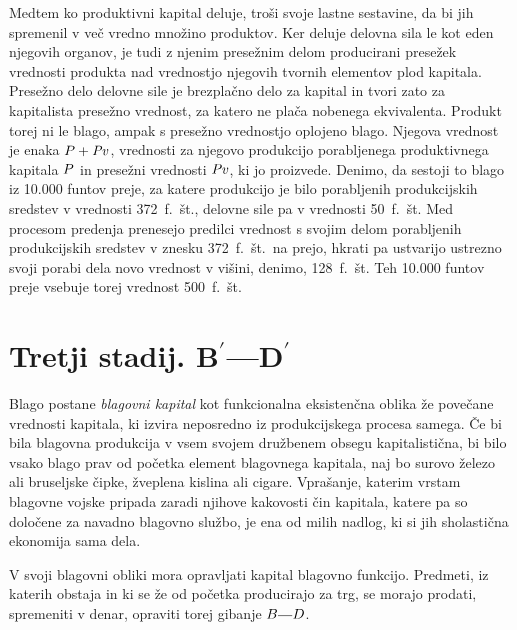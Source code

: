 \documentclass[kapital_02.tex]{subfiles}
\begin{document}
Medtem ko produktivni kapital deluje, troši svoje lastne sestavine, da bi jih spremenil v več vredno množino produktov. Ker deluje delovna sila le kot eden njegovih organov, je tudi z njenim presežnim delom producirani presežek vrednosti produkta nad vrednostjo njegovih tvornih elementov plod kapitala. Presežno delo delovne sile je brezplačno delo za kapital in tvori zato za kapitalista presežno vrednost, za katero ne plača nobenega ekvivalenta. Produkt torej ni le blago, ampak s presežno vrednostjo oplojeno blago. Njegova vrednost je enaka \(P + \mathit{Pv}\), vrednosti za njegovo produkcijo porabljenega produktivnega kapitala \(P\) in presežni vrednosti \(\mathit{Pv}\), ki jo proizvede. Denimo, da sestoji to blago iz 10.000 funtov preje, za katere produkcijo je bilo porabljenih produkcijskih sredstev v vrednosti 372~f.~št., delovne sile pa v vrednosti 50~f.~št. Med procesom predenja prenesejo predilci vrednost s svojim delom porabljenih produkcijskih sredstev v znesku 372~f.~št.\ na prejo, hkrati pa ustvarijo ustrezno svoji porabi dela novo vrednost v višini, denimo, 128~f.~št. Teh 10.000 funtov preje vsebuje torej vrednost 500~f.~št.

\section{Tretji stadij. B\ensuremath{^\prime}---D\ensuremath{^\prime}}

Blago postane \emph{blagovni kapital} kot funkcionalna eksistenčna oblika že povečane vrednosti kapitala, ki izvira neposredno iz produkcijskega procesa samega. Če bi bila blagovna produkcija v vsem svojem družbenem obsegu kapitalistična, bi bilo vsako blago prav od početka element blagovnega kapitala, naj bo surovo železo ali bruseljske čipke, žveplena kislina ali cigare. Vprašanje, katerim vrstam blagovne vojske pripada zaradi njihove kakovosti čin kapitala, katere pa so določene za navadno blagovno službo, je ena od milih nadlog, ki si jih sholastična ekonomija sama dela.

V svoji blagovni obliki mora opravljati kapital blagovno funkcijo. Predmeti, iz katerih obstaja in ki se že od početka producirajo za trg, se morajo prodati, spremeniti v denar, opraviti torej gibanje \(\KPEB\KPEcrta\KPED\).
\end{document}
